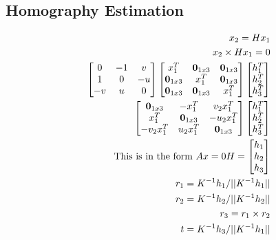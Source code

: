 \documentclass[8pt, english]{article}
\begin{document}
\begin{multicols}{4}
\subsection*{Homography Estimation}
\begin{align*}
x_2 = H x_1 \\
x_2 \times H x_1 = 0 \\ 
\begin{bmatrix}
0 & -1  & v \\  1 & 0 & -u \\  -v &  u & 0
\end{bmatrix} \begin{bmatrix}
x_1^{T} & \mathbf{0}_{1x3} &  \mathbf{0}_{1x3} \\ 
\mathbf{0}_{1x3} & x_1^{T} & \mathbf{0}_{1x3} \\ 
\mathbf{0}_{1x3} & \mathbf{0}_{1x3} & x_1^{T}
\end{bmatrix} \begin{bmatrix}
h_1^{T} \\ h_2^{T} \\ h_3^{T}
\end{bmatrix}\\
\begin{bmatrix}
\mathbf{0}_{1x3}  & -x_1^{T}  & v_2 x_1^{T} \\  x_1^{T} & \mathbf{0}_{1x3} & -u_2 x_1^{T} \\  -v_2 x_1^{T} &  u_2 x_1^{T} & \mathbf{0}_{1x3} 
\end{bmatrix} \begin{bmatrix}
h_1^{T} \\ h_2^{T} \\ h_3^{T}
\end{bmatrix}\\
\text{ This is in the form $ Ax = 0 $} 
H = \begin{bmatrix}
h_1 \\ h_2 \\ h_3 
\end{bmatrix}\\
r_1 = K^{-1}h_1 / || K^{-1} h_1 || \\
r_2 = K^{-1} h_2 / || K^{-1}h_2 || \\
r_3 = r_1 \times r_2 \\
t = K^{-1} h_3 / || K^{-1}h_1|| \\
\end{align*}

\end{multicols}
\end{document}
